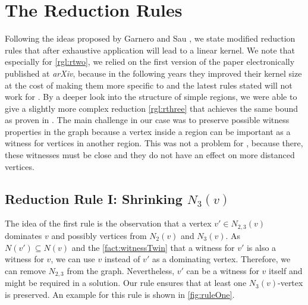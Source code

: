 \section{The Reduction Rules}

Following the ideas proposed by Garnero and Sau \cite[Revision 2014]{Garnero2018}, we state modified reduction rules that after exhaustive application will lead to a linear kernel. We note that especially for \cref{rgl:rtwo}, we relied on the first version of the paper electronically published at \textit{arXiv}, because in the following years they improved their kernel size at the cost of making them more specific to \tdom and the latest rules stated will not work for \psdom. By a deeper look into the structure of simple regions, we were able to give a slightly more complex reduction \cref{rgl:rthree} that achieves the same bound as proven in \cite[Revision 2018]{Garnero2018}.  
The main challenge in our case was to preserve possible witness properties in the graph because a vertex inside a region can be important as a witness for vertices in another region. This was not a problem for \tdom, because there, these witnesses must be close and they do not have an effect on more distanced vertices. 
\subsection{Reduction Rule I: Shrinking $N_3(v)$}


The idea of the first rule is the observation that a vertex $v' \in N_{2,3}(v)$ dominates $v$ and possibly vertices from $N_2(v)$ and $N_3(v)$. As $N(v') \subseteq N(v)$ and the \cref{fact:witnessTwin} that a witness for $v'$ is also a witness for $v$, we can use $v$ instead of $v'$ as a dominating vertex. Therefore, we can remove $N_{2,3}$ from the graph. Nevertheless, $v'$ can be a witness for $v$ itself and might be required in a solution. Our rule ensures that at least one $N_3(v)$-vertex is preserved. An example for this rule is shown in \cref{fig:ruleOne}.

